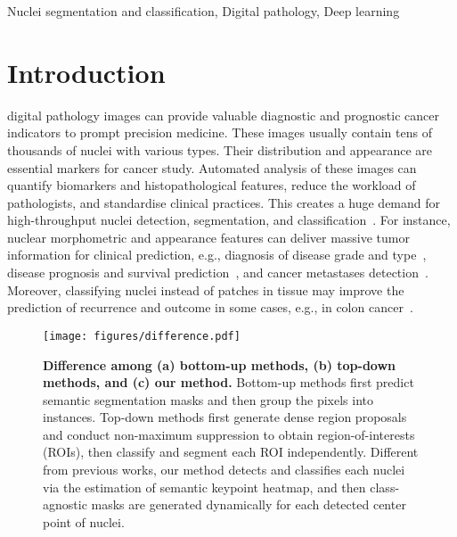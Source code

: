 \documentclass[lettersize,journal]{IEEEtran}
\begin{document}
\begin{IEEEkeywords}
Nuclei segmentation and classification, Digital pathology, Deep learning
\end{IEEEkeywords}

\section{Introduction}
\label{sec:introduction}
 digital pathology images can provide valuable diagnostic and prognostic cancer indicators to prompt precision medicine. These images usually contain tens of thousands of nuclei with various types. Their distribution and appearance are essential markers for cancer study. Automated analysis of these images can quantify biomarkers and histopathological features, reduce the workload of pathologists, and standardise clinical practices. This creates a huge demand for high-throughput nuclei detection, segmentation, and classification~\cite{chow2012nuclear}.
For instance, nuclear morphometric and appearance features can deliver massive tumor information for clinical prediction, e.g., diagnosis of disease grade and type~\cite{diagnosis}, disease prognosis and survival prediction~\cite{prognosis}, and  cancer metastases detection~\cite{metastases}. Moreover, classifying nuclei instead of patches in tissue may improve the prediction of recurrence and outcome  in some cases, e.g., in colon cancer~\cite{jiang2020machine}. 

\begin{figure}[t]
\centering
\texttt{[image: figures/difference.pdf]}
\caption{\textbf{Difference among (a) bottom-up methods, (b) top-down methods, and (c) our method.} Bottom-up methods first predict semantic segmentation masks and then group the pixels into instances. Top-down methods first generate dense region proposals and conduct non-maximum suppression to obtain region-of-interests (ROIs), then classify and segment each ROI independently. Different from previous works, our method detects and classifies each nuclei via the estimation of semantic keypoint heatmap, and then class-agnostic masks are generated dynamically for each detected center point of nuclei.}
\label{fig:diff}
\end{figure}
\end{document}
